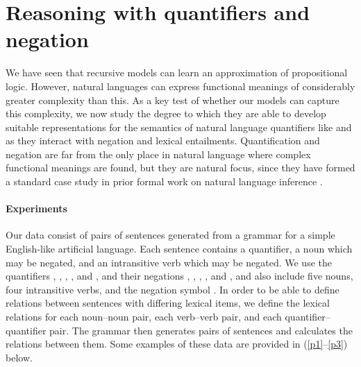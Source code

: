 \section{Reasoning with quantifiers and negation}\label{sec:quantifiers}

We have seen that recursive models can learn an approximation of propositional
logic.  However, natural languages can express functional meanings of
considerably greater complexity than this.  As a key test of whether our models 
can capture this complexity, we now study the degree to which they are able to
develop suitable representations for the semantics of natural language
quantifiers like  and  as they interact with negation and lexical entailments. Quantification 
and negation are far from the only place in natural language where complex functional meanings
are found, but they are natural focus, since they have
formed a standard case study in prior formal work on natural
language inference \cite{Icard:Moss:2013:LILT}.

\paragraph{Experiments}
Our data consist of pairs of sentences generated
from a grammar for a simple English-like artificial language.
Each sentence contains a quantifier, a noun
which may be negated, and an intransitive verb which may be
negated. We use the quantifiers , , ,
, and , and their negations , ,
, , and , and also
include five nouns, four intransitive verbs, and the negation symbol
. In order to be able to define relations between sentences
with differing lexical items, we define the lexical relations for
each noun--noun pair, each verb--verb pair, and each
quantifier--quantifier pair. The grammar then generates pairs of
sentences and calculates the relations
between them.  
Some examples of these data are provided in (\ref{p1}--\ref{p3}) below.



